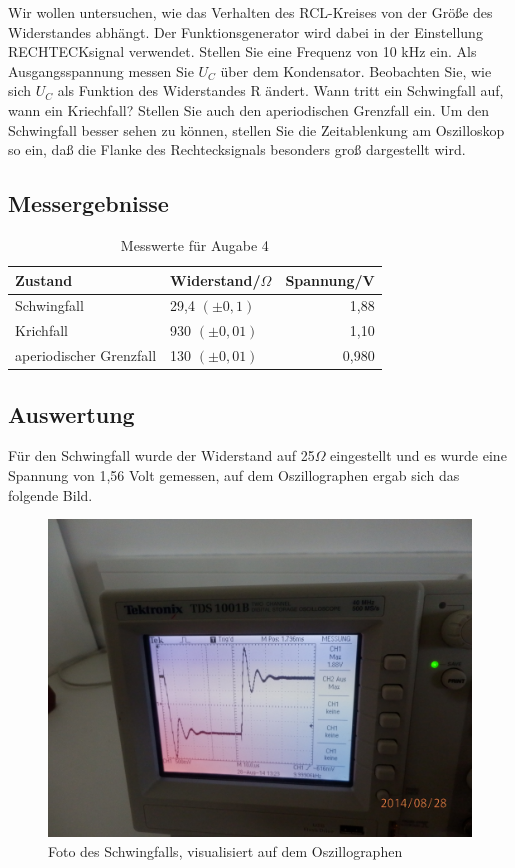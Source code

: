 \documentclass[12pt]{scrartcl}
\begin{document}
Wir wollen untersuchen, wie das Verhalten des RCL-Kreises von der Größe des Widerstandes abhängt. Der Funktionsgenerator wird dabei in der Einstellung RECHTECKsignal verwendet. Stellen Sie eine Frequenz von 10 kHz ein. Als Ausgangsspannung messen Sie
$U_C$ über dem Kondensator. Beobachten Sie, wie sich $U_C$
als Funktion des Widerstandes
R ändert. Wann tritt ein Schwingfall auf, wann ein Kriechfall? Stellen Sie auch den
aperiodischen Grenzfall ein. Um den Schwingfall besser sehen zu können, stellen Sie die Zeitablenkung am Oszilloskop so ein, daß die Flanke des Rechtecksignals besonders groß dargestellt wird.
\subsection{Messergebnisse}
\begin{table}[htbp]
 \centering
\caption{Messwerte für Augabe 4}
\begin{tabular}{|l|l|r|}
\hline
Zustand & Widerstand/$\Omega$ & \multicolumn{1}{l|}{Spannung/V} \\ \hline
Schwingfall & 29,4 $(\pm 0,1)$ & 1,88 \\ \hline
Krichfall & 930 $(\pm 0,01)$ & 1,10 \\ \hline
aperiodischer Grenzfall & 130 $(\pm 0,01)$ & 0,980 \\ \hline
\end{tabular}
\label{tab:aufgabe4}
\end{table}


\subsection{Auswertung}

Für den Schwingfall wurde der Widerstand auf 25$\Omega$ eingestellt und es wurde eine Spannung von 1,56 Volt gemessen, auf dem Oszillographen ergab sich das folgende Bild.
\begin{figure}[H] 
  \centering
    \includegraphics[scale = 0.1]{schwingfall.JPG}
  	\caption[Foto des Schwingfalls, visualisiert auf dem Oszillographen]{Foto des Schwingfalls, visualisiert auf dem Oszillographen}
  \label{fig:schwingfall}
\end{figure}
\end{document}
